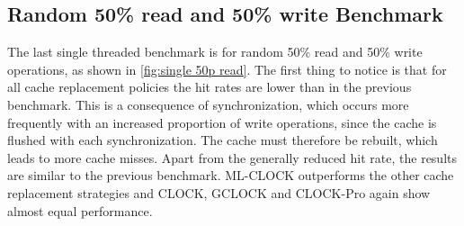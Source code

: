 \documentclass[
	12pt,
	a4paper,
	abstract,
	bibliography=totoc,
	chapterprefix,
	headings=openright,
	numbers=endperiod,
	parskip=half,
	twoside,
]{scrreprt}
\begin{document}
\newpage
\subsection{Random 50\% read and 50\% write Benchmark}

The last single threaded benchmark is for random 50\% read and 50\% write operations,
as shown in \cref{fig:single 50p read}.
The first thing to notice is that for all cache replacement policies the hit rates are lower than in the previous benchmark.
This is a consequence of synchronization, which occurs more frequently with an increased proportion of write operations,
since the cache is flushed with each synchronization. 
The cache must therefore be rebuilt, which leads to more cache misses.
Apart from the generally reduced hit rate, the results are similar to the previous benchmark.
ML-CLOCK outperforms the other cache replacement strategies and
CLOCK, GCLOCK and CLOCK-Pro again show almost equal performance.
\end{document}
